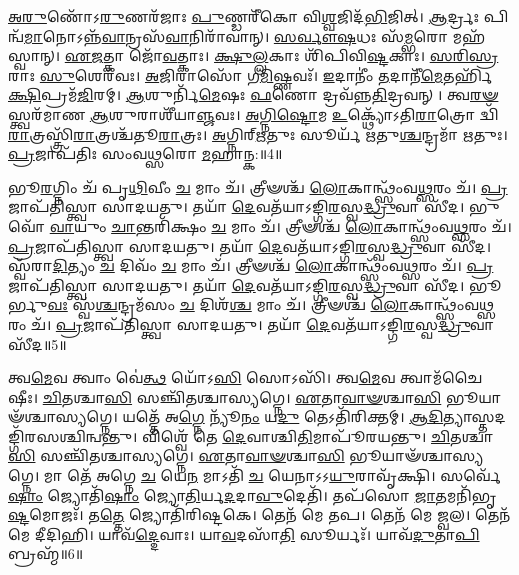    \ul{𑌅}\-\-\ul{𑌰𑍁}\-𑌣𑍋᳴𑌽\-\ul{𑌰𑍁}\-𑌣𑌰᳴𑌜𑌾𑌃 \ul{𑌪𑍁}\-𑌣𑍍𑌡𑌰𑍀᳴𑌕𑍋 𑌵𑌿\-\ul{𑌶𑍍𑌵}\-𑌜𑌿𑌦᳴\-\ul{𑌭𑌿}\-𑌜𑌿𑌤𑍍।
   \ul{𑌆}\-𑌰𑍍𑌦𑍍𑌰𑌃 𑌪𑌿𑌨𑍍𑌵᳴\-\-\ul{𑌮𑌾}\-𑌨𑍋𑌽𑌨𑍍𑌨᳴\-\ul{𑌵𑌾}\-𑌨𑍍𑌰𑌸᳴\-\ul{𑌵𑌾}\-𑌨𑌿𑌰𑌾᳴𑌵𑌾𑌨𑍍।
   \ul{𑌸}\-\-\ul{𑌰𑍍𑌵𑍗}\-\-\ul{𑌷}\-𑌧𑌃 𑌸᳴\-\ul{𑌮𑍍𑌭}\-𑌰𑍋 𑌮𑌹᳴𑌸𑍍𑌵𑌾𑌨𑍍।
   \ul{𑌏}\-\-\ul{𑌜}\-𑌤𑍍𑌕𑌾 𑌜𑍋᳴\-\ul{𑌵}\-𑌤𑍍𑌕𑌾𑌃।
   \ul{𑌕𑍍𑌷𑍁}\-\-\ul{𑌲𑍍𑌲}\-𑌕𑌾𑌃 𑌶𑌿᳴𑌪𑌿𑌵𑌿\-\ul{𑌷𑍍𑌟}\-𑌕𑌾𑌃।
   \ul{𑌸}\-\-\ul{𑌰𑌿}\-\-\ul{𑌸𑍍𑌰}\-𑌰𑌾𑌃 \ul{𑌸𑍁}\-𑌶𑍇𑌰᳴𑌵𑌃।
   \ul{𑌅}\-𑌜𑌿𑌰𑌾𑌸𑍋᳴ 𑌗\-\ul{𑌮𑌿}\-𑌷𑍍𑌣𑌵𑌃᳴।
   \ul{𑌇}\-𑌦𑌾𑌨𑍀𑌂॑ \ul{𑌤}\-𑌦𑌾𑌨𑍀᳴\-\ul{𑌮𑍇}\-𑌤𑌰𑍍\-\mbox{𑌹𑌿᳴} \ul{𑌕𑍍𑌷𑌿}\-𑌪𑍍𑌰𑌮᳴\-\ul{𑌜𑌿}\-𑌰𑌮𑍍।
   \ul{𑌆}\-𑌶𑍁𑌰𑍍𑌨𑌿᳴\-\ul{𑌮𑍇}\-𑌷𑌃 \ul{𑌫}\-𑌣𑍋 𑌦𑍍𑌰𑌵᳴𑌨𑍍𑌨\-\ul{𑌤𑌿}\-𑌦𑍍𑌰𑌵𑌨𑍍।
   𑌤𑍍𑌵\-\ul{𑌰}\-\-\ul{𑍟}\-𑌸𑍍𑌤𑍍𑌵𑌰᳴𑌮𑌾𑌣 \ul{𑌆}\-𑌶𑍁𑌰𑌾𑌶𑍀᳴𑌯𑌾\-\ul{𑌞𑍍𑌜}\-𑌵𑌃।
   \ul{𑌅}\-\-\ul{𑌗𑍍𑌨𑌿}\-\-\ul{𑌷𑍍𑌟𑍋}\-𑌮 \ul{𑌉}\-𑌕𑍍𑌥𑍍𑌯𑍋᳴𑌽𑌤𑌿\-\ul{𑌰𑌾}\-𑌤𑍍𑌰𑍋 𑌦𑍍𑌵𑌿᳴\-\ul{𑌰𑌾}\-𑌤𑍍𑌰𑌸𑍍𑌤𑍍𑌰𑌿᳴\-\ul{𑌰𑌾}\-𑌤𑍍𑌰𑌶𑍍𑌚᳴𑌤𑍂\-\-\ul{𑌰𑌾}\-𑌤𑍍𑌰𑌃।
   \ul{𑌅}\-𑌗𑍍𑌨𑌿𑌰𑍍{‌}\-\ul{𑌋}\-𑌤𑍁𑌃 𑌸𑍂𑌰𑍍𑌯᳴ \ul{𑌋}\-𑌤𑍁\-\ul{𑌶𑍍𑌚}\-𑌨𑍍𑌦𑍍𑌰𑌮𑌾᳴ \ul{𑌋}\-𑌤𑍁𑌃।
   \ul{𑌪𑍍𑌰}\-𑌜𑌾𑌪᳴𑌤𑌿𑌃 𑌸𑌂𑌵\-\ul{𑌥𑍍𑌸}\-𑌰𑍋 \ul{𑌮}\-𑌹𑌾𑌨𑍍𑌕:॥4॥
   \anuvakamend
   
   𑌭𑍂\-\ul{𑌰}\-𑌗𑍍𑌨𑌿𑌂 𑌚᳴ 𑌪𑍃\-\ul{𑌥𑌿}\-𑌵𑍀𑌂 \ul{𑌚} 𑌮𑌾𑌂 𑌚᳴।
   𑌤𑍍𑌰𑍀𑍟𑌶𑍍𑌚᳴ \ul{𑌲𑍋}\-𑌕𑌾𑌨𑍍𑌥𑍍𑌸𑌂᳴𑌵\-\ul{𑌥𑍍𑌸}\-𑌰𑌂 𑌚᳴।
   \ul{𑌪𑍍𑌰}\-𑌜𑌾𑌪᳴𑌤𑌿𑌸𑍍𑌤𑍍𑌵𑌾 𑌸𑌾𑌦𑌯𑌤𑍁।
   𑌤𑌯𑌾᳴ \ul{𑌦𑍇}\-𑌵𑌤᳴𑌯𑌾𑌽𑌙𑍍𑌗𑌿\-\ul{𑌰}\-𑌸𑍍𑌵\-\ul{𑌦𑍍𑌧𑍍𑌰𑍁}\-𑌵𑌾 𑌸𑍀᳴𑌦।
   𑌭𑍁𑌵𑍋᳴ \ul{𑌵𑌾}\-𑌯𑍁𑌂 \ul{𑌚𑌾}\-𑌨𑍍𑌤𑌰𑌿᳴𑌕𑍍𑌷𑌂 \ul{𑌚} 𑌮𑌾𑌂 𑌚᳴।
   𑌤𑍍𑌰𑍀𑍟𑌶𑍍𑌚᳴ \ul{𑌲𑍋}\-𑌕𑌾𑌨𑍍𑌥𑍍𑌸𑌂᳴𑌵\-\ul{𑌥𑍍𑌸}\-𑌰𑌂 𑌚᳴।
   \ul{𑌪𑍍𑌰}\-𑌜𑌾𑌪᳴𑌤𑌿𑌸𑍍𑌤𑍍𑌵𑌾 𑌸𑌾𑌦𑌯𑌤𑍁।
   𑌤𑌯𑌾᳴ \ul{𑌦𑍇}\-𑌵𑌤᳴𑌯𑌾𑌽𑌙𑍍𑌗𑌿\-\ul{𑌰}\-𑌸𑍍𑌵\-\ul{𑌦𑍍𑌧𑍍𑌰𑍁}\-𑌵𑌾 𑌸𑍀᳴𑌦।
   𑌸𑍍𑌵᳴𑌰𑌾\-\ul{𑌦𑌿}\-𑌤𑍍𑌯𑌂 \ul{𑌚} 𑌦𑌿𑌵𑌂᳴ \ul{𑌚} 𑌮𑌾𑌂 𑌚᳴।
   𑌤𑍍𑌰𑍀𑍟𑌶𑍍𑌚᳴ \ul{𑌲𑍋}\-𑌕𑌾𑌨𑍍𑌥𑍍𑌸𑌂᳴𑌵\-\ul{𑌥𑍍𑌸}\-𑌰𑌂 𑌚᳴।
   \ul{𑌪𑍍𑌰}\-𑌜𑌾𑌪᳴𑌤𑌿𑌸𑍍𑌤𑍍𑌵𑌾 𑌸𑌾𑌦𑌯𑌤𑍁।
   𑌤𑌯𑌾᳴ \ul{𑌦𑍇}\-𑌵𑌤᳴𑌯𑌾𑌽𑌙𑍍𑌗𑌿\-\ul{𑌰}\-𑌸𑍍𑌵\-\ul{𑌦𑍍𑌧𑍍𑌰𑍁}\-𑌵𑌾 𑌸𑍀᳴𑌦।
   𑌭𑍂𑌰𑍍𑌭𑍁\-\ul{𑌵𑌃} 𑌸𑍍𑌵᳴\-\ul{𑌶𑍍𑌚}\-𑌨𑍍𑌦𑍍𑌰𑌮᳴𑌸𑌂 \ul{𑌚} 𑌦𑌿𑌶᳴\-\ul{𑌶𑍍𑌚} 𑌮𑌾𑌂 𑌚᳴।
   𑌤𑍍𑌰𑍀𑍟𑌶𑍍𑌚᳴ \ul{𑌲𑍋}\-𑌕𑌾𑌨𑍍𑌥𑍍𑌸𑌂᳴𑌵\-\ul{𑌥𑍍𑌸}\-𑌰𑌂 𑌚᳴।
   \ul{𑌪𑍍𑌰}\-𑌜𑌾𑌪᳴𑌤𑌿𑌸𑍍𑌤𑍍𑌵𑌾 𑌸𑌾𑌦𑌯𑌤𑍁।
   𑌤𑌯𑌾᳴ \ul{𑌦𑍇}\-𑌵𑌤᳴𑌯𑌾𑌽𑌙𑍍𑌗𑌿\-\ul{𑌰}\-𑌸𑍍𑌵\-\ul{𑌦𑍍𑌧𑍍𑌰𑍁}\-𑌵𑌾 𑌸𑍀᳴𑌦॥5॥
   \anuvakamend
   
   𑌤𑍍𑌵\-\ul{𑌮𑍇}\-𑌵 𑌤𑍍𑌵𑌾𑌂 𑌵𑍇॑\-\ul{𑌤𑍍𑌥} 𑌯𑍋᳴𑌽\-\ul{𑌸𑌿} 𑌸𑍋𑌽𑌸𑌿᳴।
   𑌤𑍍𑌵\-\ul{𑌮𑍇}\-𑌵 𑌤𑍍𑌵𑌾𑌮᳴𑌚𑍈𑌷𑍀𑌃।
   \ul{𑌚𑌿}\-𑌤𑌶𑍍𑌚𑌾\-\ul{𑌸𑌿} 𑌸𑌞𑍍𑌚𑌿᳴𑌤𑌶𑍍𑌚𑌾𑌸𑍍𑌯𑌗𑍍𑌨𑍇।
   \ul{𑌏}\-𑌤𑌾\-\ul{𑌵𑌾}\-\-\ul{𑍟}\-𑌶𑍍𑌚𑌾\-\ul{𑌸𑌿} 𑌭𑍂𑌯𑌾𑍟᳴𑌶𑍍𑌚𑌾𑌸𑍍𑌯𑌗𑍍𑌨𑍇।
   𑌯𑌤𑍍𑌤𑍇᳴ 𑌅\-\ul{𑌗𑍍𑌨𑍇} 𑌨𑍍𑌯𑍂᳴\-\ul{𑌨𑌂} 𑌯\-\ul{𑌦𑍁} 𑌤𑍇𑌽𑌤𑌿᳴𑌰𑌿𑌕𑍍𑌤𑌮𑍍।
   \ul{𑌆}\-\-\ul{𑌦𑌿}\-𑌤𑍍𑌯𑌾𑌸𑍍𑌤𑌦𑌙𑍍𑌗𑌿᳴𑌰𑌸\-𑌶𑍍𑌚𑌿𑌨𑍍𑌵𑌨𑍍𑌤𑍁।
   𑌵𑌿𑌶𑍍𑌵𑍇᳴ 𑌤𑍇 \ul{𑌦𑍇}\-𑌵𑌾𑌶𑍍𑌚𑌿\-\ul{𑌤𑌿}\-𑌮𑌾𑌪𑍂᳴𑌰𑌯𑌨𑍍𑌤𑍁।
   \ul{𑌚𑌿}\-𑌤𑌶𑍍𑌚𑌾\-\ul{𑌸𑌿} 𑌸𑌞𑍍𑌚𑌿᳴𑌤𑌶𑍍𑌚𑌾𑌸𑍍𑌯𑌗𑍍𑌨𑍇।
   \ul{𑌏}\-𑌤𑌾\-\ul{𑌵𑌾}\-\-\ul{𑍟}\-𑌶𑍍𑌚𑌾\-\ul{𑌸𑌿} 𑌭𑍂𑌯𑌾𑍟᳴𑌶𑍍𑌚𑌾𑌸𑍍𑌯𑌗𑍍𑌨𑍇।
   𑌮𑌾 𑌤𑍇᳴ 𑌅𑌗𑍍𑌨𑍇 \ul{𑌚} 𑌯𑍇\-\ul{𑌨} 𑌮𑌾𑌽𑌤𑌿᳴ \ul{𑌚} 𑌯𑍇𑌨𑌾𑌽𑌽\-\ul{𑌯𑍁}\-𑌰𑌾𑌵𑍃᳴𑌕𑍍𑌷𑌿।
   𑌸𑌰𑍍𑌵𑍇᳴\-\ul{𑌷𑌾𑌂} 𑌜𑍍𑌯𑍋𑌤𑌿᳴\-\ul{𑌷𑌾𑌂} 𑌜𑍍𑌯𑍋\-\ul{𑌤𑌿}\-𑌰𑍍𑌯\-\ul{𑌦}\-𑌦𑌾\-\ul{𑌵𑍁}\-𑌦𑍇𑌤𑌿᳴।
   𑌤𑌪᳴𑌸𑍋 \ul{𑌜𑌾}\-𑌤𑌮𑌨𑌿᳴𑌭𑍃\-\ul{𑌷𑍍𑌟}\-𑌮𑍋𑌜𑌃᳴।
   𑌤\-\ul{𑌤𑍍𑌤𑍇} 𑌜𑍍𑌯𑍋𑌤𑌿᳴𑌰𑌿𑌷𑍍𑌟𑌕𑍇।
   𑌤𑍇𑌨᳴ 𑌮𑍇 𑌤𑌪।
   𑌤𑍇𑌨᳴ 𑌮𑍇 𑌜𑍍𑌵𑌲।
   𑌤𑍇𑌨᳴ 𑌮𑍇 𑌦𑍀𑌦𑌿𑌹𑌿।
   𑌯𑌾𑌵᳴\-\ul{𑌦𑍍𑌦𑍇}\-𑌵𑌾𑌃।
   𑌯𑌾\-\ul{𑌵}\-𑌦𑌸𑌾᳴\-\ul{𑌤𑌿} 𑌸𑍂𑌰𑍍𑌯𑌃᳴।
   𑌯𑌾𑌵᳴\-\ul{𑌦𑍁}\-𑌤𑌾\-\ul{𑌪𑌿} 𑌬𑍍𑌰𑌹𑍍𑌮᳴॥6॥
\anuvakamend

